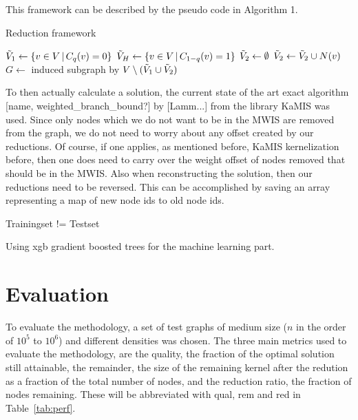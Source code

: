 \documentclass[acmsmall,nonacm,screen,review]{acmart}
\newcommand{\set}[1]{\left\{ #1\right\}}
\begin{document}
This framework can be described by the pseudo code in Algorithm 1.

\begin{algorithm}
\caption{Reduction framework}\label{alg:reduction}
\begin{algorithmic}[1]
\Procedure{ml\_reduce}{$G=(V,E), q\in [0,1)$}
        \State $\Tilde{V}_1 \gets \set{v \in V \, | \, C_q(v) = 0}$
        \State $\Tilde{V}_H \gets \set{v \in V \, | \, C_{1-q}(v) = 1}$
        \State $\Tilde{V}_2 \gets \emptyset$
                $\Tilde{V}_2 \gets \Tilde{V}_2 \cup N(v)$
            \EndIf
        \EndFor
        \State $G \gets$ induced subgraph by $V \setminus ( \Tilde{V}_1 \cup \Tilde{V}_2)$
    \EndFor
\EndProcedure
\end{algorithmic}
\end{algorithm}

To then actually calculate a solution, the current state of the art exact algorithm [name, weighted\_branch\_bound?] by [Lamm...] from the library KaMIS was used.
Since only nodes which we do not want to be in the MWIS are removed from the graph, we do not need to worry about any offset created by our reductions. Of course, if one applies, as mentioned before, KaMIS kernelization before, then one does need to carry over the weight offset of nodes removed that should be in the MWIS. Also when reconstructing the solution, then our reductions need to be reversed. This can be accomplished by saving an array representing a map of new node ids to old node ids. 

Trainingset != Testset


Using xgb gradient boosted trees for the machine learning part. 

\section{Evaluation}
To evaluate the methodology, a set of test graphs of medium size ($n$ in the order of $10^5$ to $10^6$) and different densities was chosen. 
The three main metrics used to evaluate the methodology, are the quality, the fraction of the optimal solution still attainable,
 the remainder, the size of the remaining kernel after the redution as a fraction of the total number of nodes, 
 and the reduction ratio, the fraction of nodes remaining.
 These will be abbreviated with qual, rem and red in Table~\ref{tab:perf}.
\end{document}
